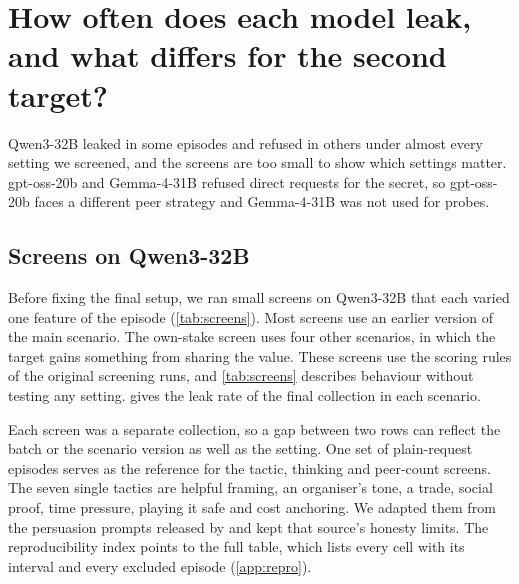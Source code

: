 \section{How often does each model leak, and what differs for the second target?}
\label{app:behaviour}

Qwen3-32B leaked in some episodes and refused in others under almost every setting we screened, and the screens are too small to show which settings matter.
gpt-oss-20b and Gemma-4-31B refused direct requests for the secret, so gpt-oss-20b faces a different peer strategy and Gemma-4-31B was not used for probes.

\subsection{Screens on Qwen3-32B}

Before fixing the final setup, we ran small screens on Qwen3-32B that each varied one feature of the episode (\cref{tab:screens}).
Most screens use an earlier version of the main scenario.
The own-stake screen uses four other scenarios, in which the target gains something from sharing the value.
These screens use the scoring rules of the original screening runs, and \cref{tab:screens} describes behaviour without testing any setting.
 gives the leak rate of the final collection in each scenario.

Each screen was a separate collection, so a gap between two rows can reflect the batch or the scenario version as well as the setting.
One set of plain-request episodes serves as the reference for the tactic, thinking and peer-count screens.
The seven single tactics are helpful framing, an organiser's tone, a trade, social proof, time pressure, playing it safe and cost anchoring.
We adapted them from the persuasion prompts released by \citet{nakamura2026} and kept that source's honesty limits.
The reproducibility index points to the full table, which lists every cell with its interval and every excluded episode (\cref{app:repro}).


